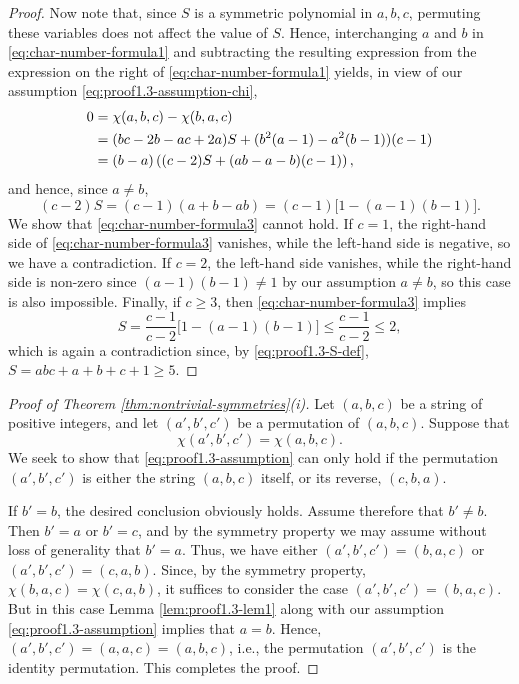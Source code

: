 \documentclass[10pt]{article}
\theoremstyle{definition}
\numberwithin{equation}{section}
\numberwithin{lemma}{section}
\begin{document}
\begin{proof}
Now note that, since $S$ is a symmetric polynomial in $a,b,c$,
permuting these variables does not affect the value of $S$. 
Hence, interchanging $a$ and $b$ in \eqref{eq:char-number-formula1}
and subtracting the resulting expression from the expression
on the right of \eqref{eq:char-number-formula1} yields, 
in view of our assumption \eqref{eq:proof1.3-assumption-chi},
\begin{align}
\notag
0&=\chi(a,b,c)-\chi(b,a,c)
\\
\notag
&=(bc-2b-ac+2a)S+(b^2(a-1)-a^2(b-1))(c-1)
\\
\notag
&=(b-a)
\left((c-2)S+(ab-a-b)(c-1)\right),
\end{align}
and hence, since $a\not=b$, 
\begin{equation}
\label{eq:char-number-formula3}
(c-2)S=(c-1)(a+b-ab)=(c-1)\bigl[1-(a-1)(b-1)\bigr].
\end{equation}
We show that \eqref{eq:char-number-formula3} cannot hold. 
If $c=1$, the right-hand side of \eqref{eq:char-number-formula3}
vanishes, while the left-hand side is negative, so we have a
contradiction. 
If $c=2$, the left-hand side vanishes, while the right-hand side is
non-zero since $(a-1)(b-1)\not=1$ by our assumption $a\not=b$, so this
case is also impossible.
Finally, if $c\ge 3$, then \eqref{eq:char-number-formula3} implies
\begin{equation*}
S=\frac{c-1}{c-2}\bigl[1-(a-1)(b-1)\bigr]\le \frac{c-1}{c-2}\le 2,
\end{equation*}
which is again a contradiction since, by  
\eqref{eq:proof1.3-S-def}, $S=abc+a+b+c+1\ge 5$.
\end{proof}

\begin{proof}[Proof of Theorem \ref{thm:nontrivial-symmetries}(i)]
Let $(a,b,c)$ be a string of positive integers, and let 
$(a',b',c')$ be a permutation of $(a,b,c)$. Suppose that 
\begin{equation}
\label{eq:proof1.3-assumption}
\chi(a',b',c') = \chi(a,b,c).
\end{equation}
We seek to show that \eqref{eq:proof1.3-assumption}
can only hold if the permutation $(a',b',c')$
is either the string $(a,b,c)$ itself, or its reverse, $(c,b,a)$. 


If $b'=b$, the desired conclusion obviously holds. Assume therefore that 
$b'\not=b$. Then $b'=a$ or $b'=c$, and by the symmetry property we may 
assume without loss of generality that $b'=a$. Thus, we have 
either $(a',b',c')=(b,a,c)$ or $(a',b',c')=(c,a,b)$. Since, by the
symmetry property, $\chi(b,a,c)=\chi(c,a,b)$, it suffices to consider
the case $(a',b',c')=(b,a,c)$. But in this case 
Lemma \ref{lem:proof1.3-lem1} along with 
our assumption \eqref{eq:proof1.3-assumption} implies that  $a=b$. 
Hence, $(a',b',c')=(a,a,c)=(a,b,c)$, i.e., the permutation $(a',b',c')$ 
is the identity permutation. This completes the proof.
\end{proof}
\end{document}
